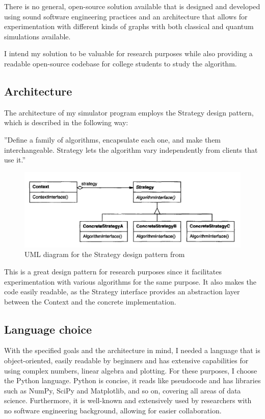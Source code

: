 There is no general, open-source solution available that is designed and developed using sound software engineering practices and an architecture that allows for experimentation with different kinds of graphs with both classical and quantum simulations available.

I intend my solution to be valuable for research purposes while also providing a readable open-source codebase for college students to study the algorithm.

\subsection{Architecture}

The architecture of my simulator program employs the Strategy design pattern, which is described in the following way:

''Define a family of algorithms, encapsulate each one, and make them interchangeable. Strategy lets the algorithm vary independently from clients that use it.''~\cite{DesignPatterns}

\begin{figure}[H]
  \includegraphics[width=\linewidth]{./figures/program/strategy.png}
  \caption{UML diagram for the Strategy design pattern from~\cite{DesignPatterns}}
\end{figure}

This is a great design pattern for research purposes since it facilitates experimentation with various algorithms for the same purpose. It also makes the code easily readable, as the Strategy interface provides an abstraction layer between the Context and the concrete implementation.

\subsection{Language choice}

With the specified goals and the architecture in mind, I needed a language that is object-oriented, easily readable by beginners and has extensive capabilities for using complex numbers, linear algebra and plotting. For these purposes, I choose the Python language. Python is concise, it reads like pseudocode and has libraries such as NumPy, SciPy and Matplotlib, and so on, covering all areas of data science. Furthermore, it is well-known and extensively used by researchers with no software engineering background, allowing for easier collaboration.

